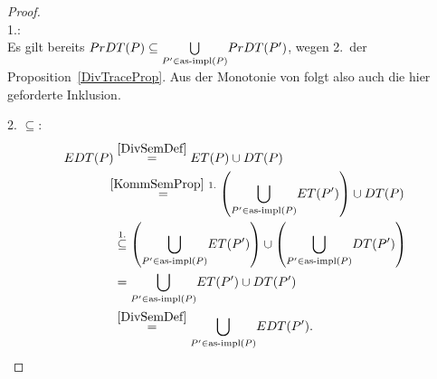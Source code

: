 \begin{proof}\mbox{}\\
  1.:\\
  Es gilt bereits $PrDT (P) \subseteq \underset{P'\in\mathrm{as}\text{-}\mathrm{impl} (P)}{\bigcup}
  PrDT (P')$, wegen 2.\ der Proposition~\ref{DivTraceProp}. Aus der Monotonie
  von \cont{} folgt also auch die hier geforderte Inklusion.

  2. \glqq$\subseteq$\grqq{}:
  \begin{align*}
    \EDT (P)&\overset{\ref{DivSemDef}}{=} \ET (P)\cup \DT (P)\\
    &\hspace{-0.2cm}\overset{\ref{KommSemProp}~1.}{=} \left(\underset{P'\in
    \asimp (P)}{\bigcup} \ET (P')\right)\cup \DT (P)\\
    &\overset{1.}{\subseteq} \left(\underset{P'\in
    \asimp (P)}{\bigcup} \ET (P')\right)\cup \left(\underset{P'\in \asimp
    (P)}{\bigcup} \DT (P')\right)\\
    &= \underset{P'\in \asimp (P)}{\bigcup} \ET (P') \cup \DT (P')\\
    &\overset{\ref{DivSemDef}}{=} \underset{P'\in\asimp (P)}{\bigcup} \EDT
    (P').\\
  \end{align*}


\end{proof}
